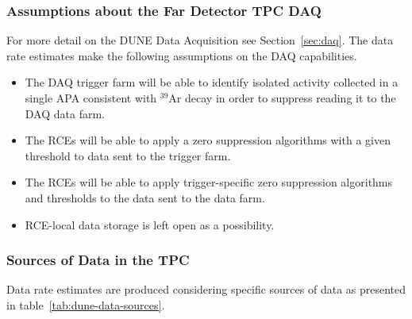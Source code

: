 \subsubsection{Assumptions about the Far Detector TPC DAQ}
For more detail on the DUNE Data Acquisition see Section~\ref{sec:daq}.
The data rate estimates make the following assumptions on the DAQ capabilities.


\begin{itemize}
\item The DAQ trigger farm will be able to identify isolated activity
  collected in a single APA consistent with $^{39}$Ar decay in order
  to suppress reading it to the DAQ data farm.
\item The RCEs will be able to apply a zero suppression
  algorithms with a given threshold to data sent to the trigger farm.
\item The RCEs will be able to apply trigger-specific zero suppression
  algorithms and thresholds to the data sent to the data farm.
\item RCE-local data storage is left open as a possibility.
\end{itemize}

\subsubsection{Sources of Data in the TPC}

Data rate estimates are produced considering specific sources of
data as presented in table~\ref{tab:dune-data-sources}.


